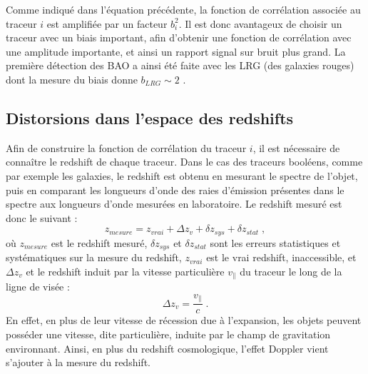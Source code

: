 \documentclass[11pt, twoside, a4paper, openright]{report}
\begin{document}
Comme indiqué dans l'équation précédente, la fonction de corrélation associée au traceur $i$ est amplifiée par un facteur $b_{i}^2$.
Il est donc avantageux de choisir un traceur avec un biais important, afin d'obtenir une fonction de corrélation avec une amplitude importante, et ainsi un rapport signal sur bruit plus grand. La première détection des BAO a ainsi été faite avec les LRG (des galaxies rouges) dont la mesure du biais donne $b_{LRG} \sim 2$ \autocite{Eisenstein2005}.

\subsection{Distorsions dans l'espace des redshifts}
Afin de construire la fonction de corrélation du traceur $i$, il est nécessaire de connaître le redshift de chaque traceur. Dans le cas des traceurs booléens, comme par exemple les galaxies, le redshift est obtenu en mesurant le spectre de l'objet, puis en comparant les longueurs d'onde des raies d'émission présentes dans le spectre aux longueurs d'onde mesurées en laboratoire. Le redshift mesuré est donc le suivant :
\begin{equation}
  z_{mesure} = z_{vrai} + \Delta z_{v} + \delta z_{sys} + \delta z_{stat}  \; ,
\end{equation}
où $z_{mesure}$ est le redshift mesuré, $\delta z_{sys}$ et $\delta z_{stat}$ sont les erreurs statistiques et systématiques sur la mesure du redshift, $z_{vrai}$ est le vrai redshift, inaccessible,
et $\Delta z_{v}$ et le redshift induit par la vitesse particulière $v_{\parallel}$ du traceur le long de la ligne de visée :
\begin{equation}
  \label{eq:delta_z}
  \Delta z_{v} = \frac{v_{\parallel}}{c} \; .
\end{equation}
En effet, en plus de leur vitesse de récession due à l'expansion, les objets peuvent posséder une vitesse, dite particulière, induite par le champ de gravitation environnant. 
Ainsi, en plus du redshift cosmologique, l'effet Doppler vient s'ajouter à la mesure du redshift.
\end{document}
